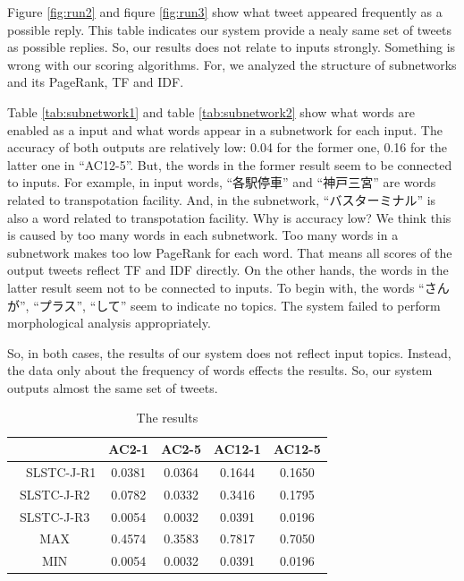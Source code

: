 \documentclass{../style/sig-alternate}
\begin{document}
Figure \ref{fig:run2} and fiqure \ref{fig:run3} show what tweet appeared frequently as a possible reply. This table indicates our system provide a nealy same set of tweets as possible replies. So, our results does not relate to inputs strongly. Something is wrong with our scoring algorithms. For, we analyzed the structure of subnetworks and its PageRank, TF and IDF.


Table \ref{tab:subnetwork1} and table \ref{tab:subnetwork2} show what words are enabled as a input and what words appear in a subnetwork for each input.
The accuracy of both outputs are relatively low: 0.04 for the former one, 0.16 for the latter one in ``AC12-5''. But, the words in the former result seem to be connected to inputs. For example, in input words, \mbox{``各駅停車''} and \mbox{``神戸三宮''} are words related to transpotation facility. And, in the subnetwork, \mbox{``バスターミナル''} is also a word related to transpotation facility. Why is accuracy low? We think this is caused by too many words in each subnetwork. Too many words in a subnetwork makes too low PageRank for each word. That means all scores of the output tweets reflect TF and IDF directly.
On the other hands, the words in the latter result seem not to be connected to inputs. To begin with, the words \mbox{``さんが''}, \mbox{``プラス''}, \mbox{``して''} seem to indicate no topics. The system failed to perform morphological analysis appropriately.


So, in both cases, the results of our system does not reflect input topics. Instead, the data only about the frequency of words effects the results. So, our system outputs almost the same set of tweets.

\begin{table}[h!]
  \centering
  \caption{The results}
  \label{tab:results}
  \begin{tabular}{|c|c|c|c|c|} \hline
    　 & AC2-1 & AC2-5 & AC12-1 & AC12-5 \\ \hline
    　SLSTC-J-R1 & 0.0381 & 0.0364 & 0.1644 & 0.1650 \\ \hline
      SLSTC-J-R2 & 0.0782 & 0.0332 & 0.3416 & 0.1795\\ \hline
      SLSTC-J-R3 & 0.0054 & 0.0032 & 0.0391 & 0.0196\\ \hline
      MAX & 0.4574 & 0.3583 & 0.7817 & 0.7050\\ \hline
      MIN & 0.0054 & 0.0032 & 0.0391 & 0.0196\\ \hline
  \end{tabular}
\end{table}
\end{document}
